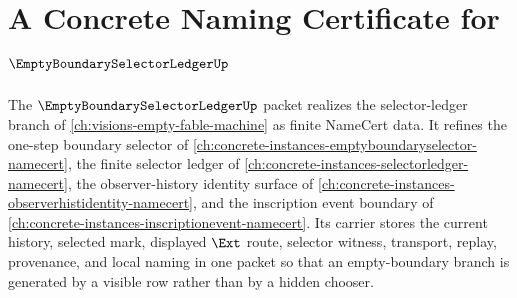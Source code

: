 \chapter{A Concrete Naming Certificate for $\EmptyBoundarySelectorLedgerUp$}
\label{ch:concrete-instances-empty-boundary-selector-ledger-namecert}

The $\EmptyBoundarySelectorLedgerUp$ packet realizes the selector-ledger branch of \autoref{ch:visions-empty-fable-machine} as finite NameCert data. It refines the one-step boundary selector of \autoref{ch:concrete-instances-emptyboundaryselector-namecert}, the finite selector ledger of \autoref{ch:concrete-instances-selectorledger-namecert}, the observer-history identity surface of \autoref{ch:concrete-instances-observerhistidentity-namecert}, and the inscription event boundary of \autoref{ch:concrete-instances-inscriptionevent-namecert}. Its carrier stores the current history, selected mark, displayed $\Ext$ route, selector witness, transport, replay, provenance, and local naming in one packet so that an empty-boundary branch is generated by a visible row rather than by a hidden chooser.

